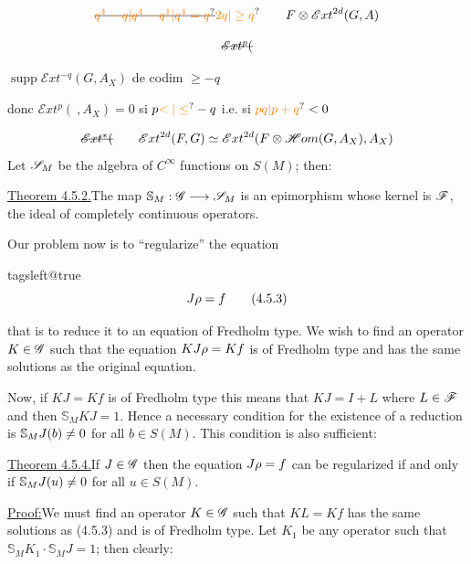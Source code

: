 \[
\deleted{\unsure{q^4-q|q^4-q^1|q^4=q}}\unsure{2q|\geq q}\qquad F\otimes\mathscr{E}xt^{2d}(G,A)
\]

\[
\deleted{\mathscr{E}xt^p(}
\]

$\operatorname{supp}\mathscr{E}xt^{-q}(G,A_X)$ de codim $\geq-q$


donc $\mathscr{E}xt^p(\ ,A_X)=0$ si $p\unsure{<|\leq}-q$ i.e. si $\unsure{pq|p+q}<0$

\[
\deleted{\mathscr{E}xt^*(}\qquad \mathscr{E}xt^{2d}(F,G)\simeq\mathscr{E}xt^{2d}(F\otimes\mathscr{H}om(G,A_X),A_X)
\]
Let $\mathscr{S}_M$ be the algebra of $C^\infty$ functions on $S(M)$; then:

\uline{Theorem 4.5.2.}\qquad The map $\mathbb{S}_M:\mathscr{G}\longrightarrow\mathscr{S}_M$ is an epimorphism whose kernel is $\mathscr{F}$, the ideal of completely continuous operators.

Our problem now is to ``regularize'' the equation

\begingroup
\csname tagsleft@true\endcsname
\[
J\rho=f\tag*{(4.5.3)}
\]
\endgroup

that is to reduce it to an equation of Fredholm type. We wish to find an operator $K\in\mathscr{G}$ such that the equation $KJ\rho=Kf$ is of Fredholm type and has the same solutions as the original equation.

Now, if $KJ=Kf$ is of Fredholm type this means that $KJ=I+L$ where $L\in\mathscr{F}$ and then $\mathbb{S}_M KJ=1$. Hence a necessary condition for the existence of a reduction is $\mathbb{S}_M J(b)\not=0$ for all $b\in S(M)$. This condition is also sufficient:

\uline{Theorem 4.5.4.}\qquad If $J\in\mathscr{G}$ then the equation $J\rho=f$ can be regularized if and only if $\mathbb{S}_M J(u)\not=0$ for all $u\in S(M)$.

\uline{Proof:}\quad We must find an operator $K\in\mathscr{G}$ such that $KL=Kf$ has the same solutions as (4.5.3) and is of Fredholm type. Let $K_1$ be any operator such that $\mathbb{S}_M K_1\cdot\mathbb{S}_M J=1$; then clearly:

